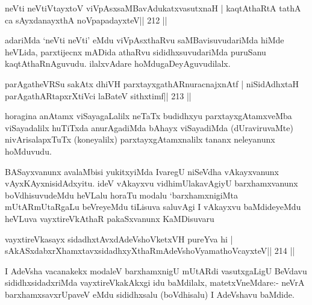 
\begin{shl}
neVti neVtiVtayxtoV viVpAsxsaMBavAdukatxvasutxnaH |
kaqtAthaRtA tathA ca sAyxdanayxthA noVpapadayxteV\hfill || 212 ||
\end{shl}

\begin{artha}
adariMda `neVti neVti' eMdu viVpAsxthaRvu saMBavisuvudariMda hiMde heVLida, parxtijecnx mADida athaRvu sididhxsuvudariMda puruSanu kaqtAthaRnAguvudu. ilalxvAdare hoMdugaDeyAguvudilalx.
\end{artha}


\begin{shl}
parAgatheVRSu sakAtx dhiVH parxtayxgathARnuracnajxnAtf |
niSidAdhx\s taH parAgathARtapxrXtiVci laBateV sithxtimf\hfill || 213 ||
\end{shl}

\begin{artha}
horagina anAtamx viSayagaLalilx neTaTx budidhxyu parxtayxgAtamxveMba
viSayadalilx huTiTxda anurAgadiMda bAhayx viSayadiMda (dUraviruvaMte)
nivArisalapxTuTx (koneyalilx) parxtayxgAtamxnalilx tananx neleyanunx hoMduvudu.
\end{artha}


\begin{artha}
BASayxvanunx avalaMbisi yukitxyiMda IvaregU niSeVdha
vAkayxvanunx vAyxKAyxnisidAdxyitu. ideV vAkayxvu vidhimUlakavAgiyU
barxhamxvanunx boVdhisuvudeMdu heVLalu horaTu modalu `barxhamxnigiMta
mUtARmUtaRgaLu beVreyeMdu tiLisuva saluvAgi I vAkayxvu baMdideyeMdu
heVLuva vayxtireVkAthaR pakaSxvanunx KaMDisuvaru  \mdash 
\end{artha}

\begin{shl}
vayxtireVkasayx sidadhxtAvxdAdeVshoVketxVH pureYva hi |
sAkASxdabxrXhamxtavxsidadhxyXthaRmAdeVshoV\s yamathoVcayxteV\hfill || 214 ||
\end{shl}

\begin{artha}
I AdeVsha vacanakekx modaleV barxhamxnigU mUtARdi vasutxgaLigU BeVdavu sididhxsidadxriMda vayxtireVkakAkxgi idu baMdilalx, matetxVneMdare:- neVrA barxhamxsavxrUpaveV eMdu sididhxsalu (boVdhisalu) I AdeVshavu baMdide.
\end{artha}

